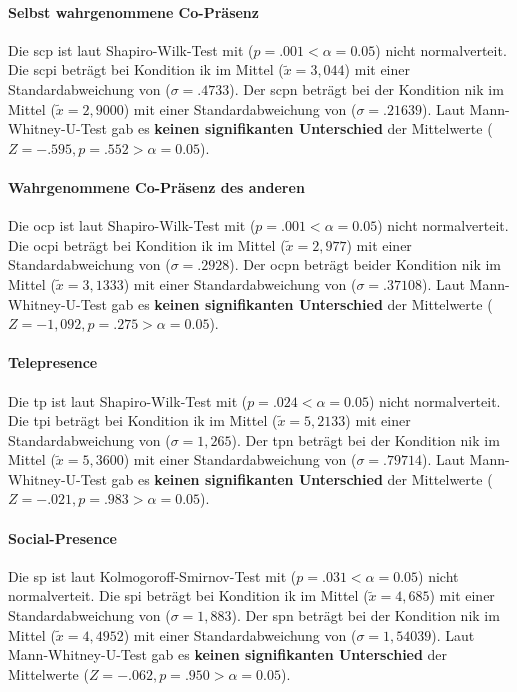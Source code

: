 \documentclass[a4paper,11pt]{article}%
\renewcommand{\\}{\vspace*{0.5\baselineskip} \newline}
\begin{document}
\paragraph{Selbst wahrgenommene Co-Präsenz}
Die \acf{scp} ist laut Shapiro-Wilk-Test mit ($p = .001 < \alpha = 0.05$) nicht normalverteit.
Die \ac{scpi} beträgt bei Kondition \ac{ik} im Mittel ($\tilde x = 3,044$) mit einer Standardabweichung von ($\sigma = .4733$).\newline 
Der \ac{scpn} beträgt bei der Kondition \ac{nik} im Mittel ($\tilde x = 2,9000$) mit einer Standardabweichung von ($\sigma = .21639$). Laut Mann-Whitney-U-Test gab es \textbf{keinen signifikanten Unterschied} der Mittelwerte ($ Z = -.595, p = .552 > \alpha = 0.05$).

\paragraph{Wahrgenommene Co-Präsenz des anderen}
Die \acf{ocp} ist laut Shapiro-Wilk-Test mit ($p = .001 < \alpha = 0.05$) nicht normalverteit.
Die \ac{ocpi} beträgt bei Kondition \ac{ik} im Mittel ($\tilde x = 2,977$) mit einer Standardabweichung von ($\sigma = .2928$).
Der \ac{ocpn} beträgt beider Kondition \ac{nik} im Mittel ($\tilde x =3,1333$) mit einer Standardabweichung von ($\sigma =.37108$). Laut Mann-Whitney-U-Test gab es \textbf{keinen signifikanten Unterschied} der Mittelwerte ($ Z = -1,092 , p = .275 > \alpha = 0.05$).

\paragraph{Telepresence} 
Die \acf{tp} ist laut Shapiro-Wilk-Test mit ($p = .024 < \alpha = 0.05$) nicht normalverteit. 
Die \ac{tpi} beträgt bei Kondition \ac{ik} im Mittel ($\tilde x = 5,2133$) mit einer Standardabweichung von ($\sigma = 1,265$).
Der \ac{tpn} beträgt bei der Kondition \ac{nik} im Mittel ($\tilde x = 5,3600$) mit einer Standardabweichung von ($\sigma = .79714$). Laut Mann-Whitney-U-Test gab es \textbf{keinen signifikanten Unterschied} der Mittelwerte ($ Z = -.021 , p = .983 > \alpha = 0.05$).
\paragraph{Social-Presence} 
Die \acf{sp} ist laut Kolmogoroff-Smirnov-Test mit ($p = .031 < \alpha = 0.05$) nicht normalverteit. 
Die \ac{spi} beträgt bei Kondition \ac{ik} im Mittel ($\tilde x = 4,685$) mit einer Standardabweichung von ($\sigma = 1,883$).
Der \ac{spn} beträgt bei der Kondition \ac{nik} im Mittel ($\tilde x = 4,4952$) mit einer Standardabweichung von ($\sigma = 1,54039$). Laut Mann-Whitney-U-Test gab es \textbf{keinen signifikanten Unterschied} der Mittelwerte ($ Z = -.062 , p = .950 > \alpha = 0.05$).
\end{document}

